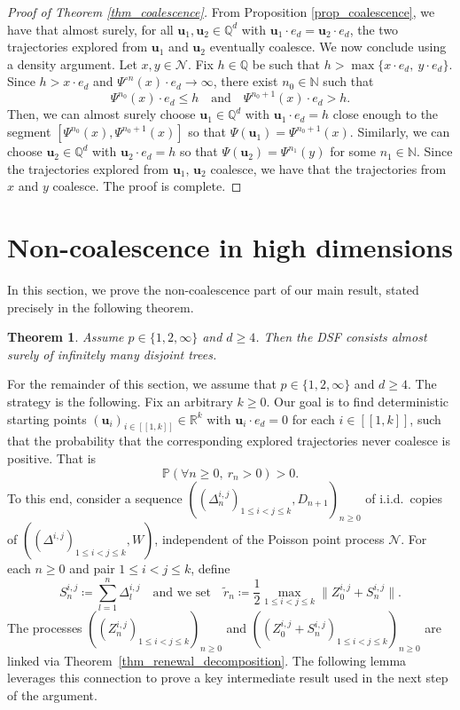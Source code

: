 \documentclass[a4paper, 11pt]{article}
\theoremstyle{plain}
\newtheorem{Theorem}{Theorem}[section]
\theoremstyle{definition}
\newcommand{\R}{\mathbb{R}}
\newcommand{\N}{\mathbb{N}}
\newcommand{\Q}{\mathbb{Q}}
\renewcommand{\P}{\mathbb{P}}
\newcommand{\range}[2]{[\![#1,#2]\!]}
\numberwithin{equation}{section}
\begin{document}
\begin{proof}[Proof of Theorem \ref{thm_coalescence}]
    From Proposition \ref{prop_coalescence}, we have that almost surely, for all $\mathbf u_1,\mathbf u_2\in\Q^d$ with $\mathbf u_1\cdot e_d=\mathbf u_2\cdot e_d$, the two trajectories explored from $\mathbf u_1$ and $\mathbf u_2$ eventually coalesce. We now conclude using a density argument. Let $x,y\in\mathcal N$. Fix $h\in\Q$ be such that $h>\max\{x\cdot e_d,~y\cdot e_d\}$. Since $h>x\cdot e_d$ and $\Psi^{\circ n}(x)\cdot e_d\to\infty$, there exist $n_0\in\N$ such that
        \[\Psi^{n_0}(x)\cdot e_d\leq h\quad\text{and}\quad\Psi^{n_0+1}(x)\cdot e_d>h.\]
    Then, we can almost surely choose $\mathbf u_1\in\Q^d$ with $\mathbf u_1\cdot e_d=h$ close enough to the segment $[\Psi^{n_0}(x), \Psi^{n_0+1}(x)]$ so that $\Psi(\mathbf u_1)=\Psi^{n_0+1}(x)$. Similarly, we can choose $\mathbf u_2\in\Q^d$ with $\mathbf u_2\cdot e_d=h$ so that $\Psi(\mathbf u_2)=\Psi^{n_1}(y)$ for some $n_1\in\N$. Since the trajectories explored from $\mathbf u_1$, $\mathbf u_2$ coalesce, we have that the trajectories from $x$ and $y$ coalesce. The proof is complete.
\end{proof}


\section{Non-coalescence in high dimensions}

\label{section_non_coalescence}


In this section, we prove the non-coalescence part of our main result, stated precisely in the following theorem.


\begin{Theorem}
    \label{thm_non_coalescence}
    Assume $p\in\{1, 2, \infty\}$ and $d\geq 4$. Then the DSF consists almost surely of infinitely many disjoint trees.
\end{Theorem}


For the remainder of this section, we assume that $p\in\{1, 2, \infty\}$ and $d\geq 4$. The strategy is the following. Fix an arbitrary $k\geq 0$. Our goal is to find deterministic starting points $(\mathbf u_i)_{i\in\range{1}{k}}\in\R^k$ with $\mathbf u_i\cdot e_d=0$ for each $i\in\range{1}{k}$, such that the probability that the corresponding explored trajectories never coalesce is positive. That is
    \[\P(\forall n\geq0,~r_n>0)>0.\]
To this end, consider a sequence $((\Delta^{i, j}_n)_{1\leq i<j\leq k},D_{n+1})_{n\geq 0}$ of i.i.d.\ copies of $((\Delta^{i, j})_{1\leq i<j\leq k},W)$, independent of the Poisson point process $\mathcal N$. For each $n\geq 0$ and pair $1\leq i<j\leq k$, define
    \[S_n^{i, j}\coloneqq\sum_{l=1}^n \Delta_l^{i, j}\quad\text{and we set}\quad\tilde r_n\coloneqq\frac{1}{2}\max_{1\leq i<j\leq k}\|Z_0^{i, j}+S_n^{i, j}\|.\]
The processes $((Z_n^{i, j})_{1\leq i<j\leq k})_{n\geq 0}$ and $((Z_0^{i, j}+S_n^{i, j})_{1\leq i<j\leq k})_{n\geq 0}$ are linked via Theorem~\ref{thm_renewal_decomposition}. The following lemma leverages this connection to prove a key intermediate result used in the next step of the argument.
\end{document}
